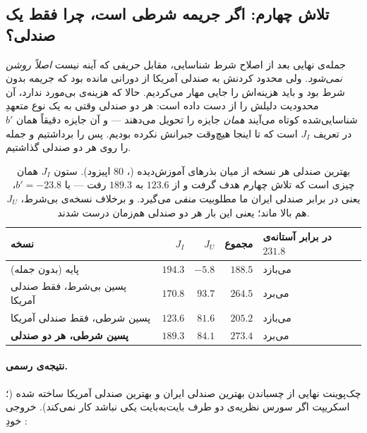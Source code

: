 \documentclass[12pt,a4paper]{article}
\begin{document}
\subsection{تلاش چهارم: اگر جریمه شرطی است، چرا فقط یک صندلی؟}
\label{sec:both}

جمله‌ی نهایی بعد از اصلاح شرط شناسایی، مقابل حریفی که آینه نیست \emph{اصلاً
روشن نمی‌شود}. ولی محدود کردنش به صندلی آمریکا از دورانی مانده بود که جریمه
بدون شرط بود و باید هزینه‌اش را جایی مهار می‌کردیم. حالا که هزینه‌ی بی‌مورد
ندارد، آن محدودیت دلیلش را از دست داده است: هر دو صندلی وقتی به یک نوع
متعهدِ شناسایی‌شده کوتاه می‌آیند \emph{همان} جایزه را تحویل می‌دهند — و آن
جایزه دقیقاً همان $b'$ در تعریف $J_I$ است که تا اینجا هیچ‌وقت جبرانش نکرده
بودیم. پس  را برداشتیم و جمله را روی هر دو صندلی گذاشتیم.

\begin{table}[h]\centering\small
\begin{tabular}{lrrrl}
\toprule
نسخه & $J_I$ & $J_U$ & مجموع & در برابر آستانه‌ی $231.8$\\
\midrule
پایه (بدون جمله)               & $194.3$ & $-5.8$  & $188.5$ & می‌بازد\\
پسین بی‌شرط، فقط صندلی آمریکا   & $170.8$ & $93.7$  & $264.5$ & می‌برد\\
پسین شرطی، فقط صندلی آمریکا     & $123.6$ & $81.6$  & $205.2$ & می‌بازد\\
\textbf{پسین شرطی، هر دو صندلی} & $\mathbf{189.3}$ & $\mathbf{84.1}$ & $\mathbf{273.4}$ & می‌برد\\
\bottomrule
\end{tabular}
\caption{بهترین صندلی هر نسخه از میان بذرهای آموزش‌دیده
(، $80$ اپیزود). ستون $J_I$ همان چیزی است که
تلاش چهارم هدف گرفت و از $123.6$ به $189.3$ رفت — با $b'=-23.8$، یعنی
 در برابر صندلی ایران ما مطلوبیت \emph{منفی} می‌گیرد. و
برخلاف نسخه‌ی بی‌شرط، $J_U$ هم بالا ماند؛ یعنی این بار هر دو صندلی
هم‌زمان درست شدند.}
\end{table}

\paragraph{نتیجه‌ی رسمی.}
چک‌پوینت نهایی از چسباندن بهترین صندلی ایران و بهترین صندلی آمریکا ساخته
شده (؛ اسکریپت اگر سورس نظریه‌ی دو طرف بایت‌به‌بایت
یکی نباشد کار نمی‌کند). خروجی خودِ :
\end{document}
